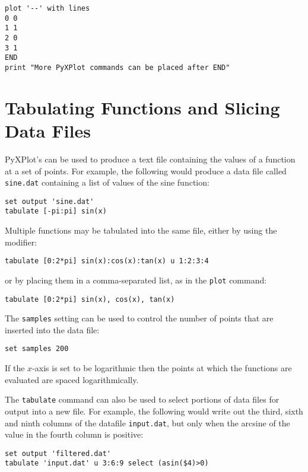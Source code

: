 \begin{verbatim}
plot '--' with lines
0 0
1 1
2 0
3 1
END
print "More PyXPlot commands can be placed after END"
\end{verbatim}

\section{Tabulating Functions and Slicing Data Files}

PyXPlot's  can be used to produce a text file containing the
values of a function at a set of points.  For example, the following would
produce a data file called {\tt sine.dat} containing a list of values of the
sine function:

\begin{verbatim}
set output 'sine.dat'
tabulate [-pi:pi] sin(x)
\end{verbatim}

\noindent Multiple functions may be tabulated into the same file, either by
using the  modifier:

\begin{verbatim}
tabulate [0:2*pi] sin(x):cos(x):tan(x) u 1:2:3:4
\end{verbatim}

\noindent or by placing them in a comma-separated list, as in the {\tt plot}
command:

\begin{verbatim}
tabulate [0:2*pi] sin(x), cos(x), tan(x)
\end{verbatim}

The {\tt samples} setting can be used to control the number of points that are
inserted into the data file:

\begin{verbatim}
set samples 200
\end{verbatim}

\noindent If the $x$-axis is set to be logarithmic then the points at which the
functions are evaluated are spaced logarithmically.

The {\tt tabulate} command can also be used to select portions of data files
for output into a new file.  For example, the following would write out the
third, sixth and ninth columns of the datafile {\tt input.dat}, but only when
the arcsine of the value in the fourth column is positive:

\begin{verbatim}
set output 'filtered.dat'
tabulate 'input.dat' u 3:6:9 select (asin($4)>0)
\end{verbatim}

